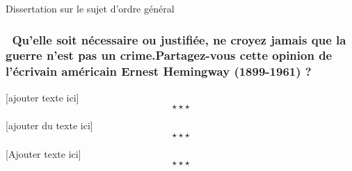 \newpage \begin{bclogo}[barre=none,logo={}]{
		Dissertation sur le sujet d'ordre général
	}
	\begin{center}
		\subsubsection*{\guillemetleft\ Qu'elle soit nécessaire ou justifiée, ne croyez jamais que la guerre n'est pas un crime\guillemetright .\newline\newline Partagez-vous cette opinion de l'écrivain américain Ernest Hemingway (1899-1961) ?}
		
	\end{center}
\end{bclogo}

[ajouter texte ici] $$\star \star \star$$

[ajouter du texte ici]$$\star \star \star$$

[Ajouter texte ici] $$\star \star \star$$
